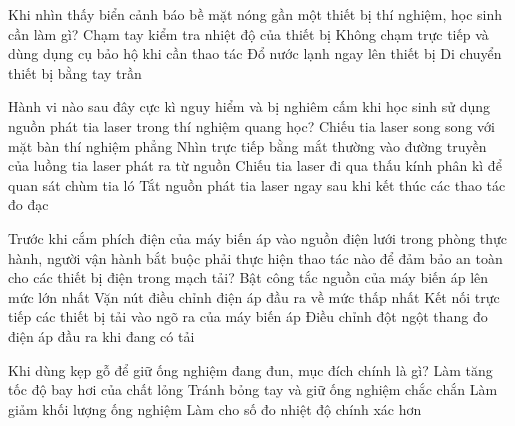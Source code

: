 \begin{ex}
Khi nhìn thấy biển cảnh báo bề mặt nóng gần một thiết bị thí nghiệm, học sinh cần làm gì?
\choice
{Chạm tay kiểm tra nhiệt độ của thiết bị}
{\True Không chạm trực tiếp và dùng dụng cụ bảo hộ khi cần thao tác}
{Đổ nước lạnh ngay lên thiết bị}
{Di chuyển thiết bị bằng tay trần}
\end{ex}

\begin{ex}
Hành vi nào sau đây cực kì nguy hiểm và bị nghiêm cấm khi học sinh sử dụng nguồn phát tia laser trong thí nghiệm quang học?
\choice
{Chiếu tia laser song song với mặt bàn thí nghiệm phẳng}
{\True Nhìn trực tiếp bằng mắt thường vào đường truyền của luồng tia laser phát ra từ nguồn}
{Chiếu tia laser đi qua thấu kính phân kì để quan sát chùm tia ló}
{Tắt nguồn phát tia laser ngay sau khi kết thúc các thao tác đo đạc}
\end{ex}

\begin{ex}
Trước khi cắm phích điện của máy biến áp vào nguồn điện lưới trong phòng thực hành, người vận hành bắt buộc phải thực hiện thao tác nào để đảm bảo an toàn cho các thiết bị điện trong mạch tải?
\choice
{Bật công tắc nguồn của máy biến áp lên mức lớn nhất}
{\True Vặn nút điều chỉnh điện áp đầu ra về mức thấp nhất}
{Kết nối trực tiếp các thiết bị tải vào ngõ ra của máy biến áp}
{Điều chỉnh đột ngột thang đo điện áp đầu ra khi đang có tải}
\end{ex}

\begin{ex}
Khi dùng kẹp gỗ để giữ ống nghiệm đang đun, mục đích chính là gì?
\choice
{Làm tăng tốc độ bay hơi của chất lỏng}
{\True Tránh bỏng tay và giữ ống nghiệm chắc chắn}
{Làm giảm khối lượng ống nghiệm}
{Làm cho số đo nhiệt độ chính xác hơn}
\end{ex}

